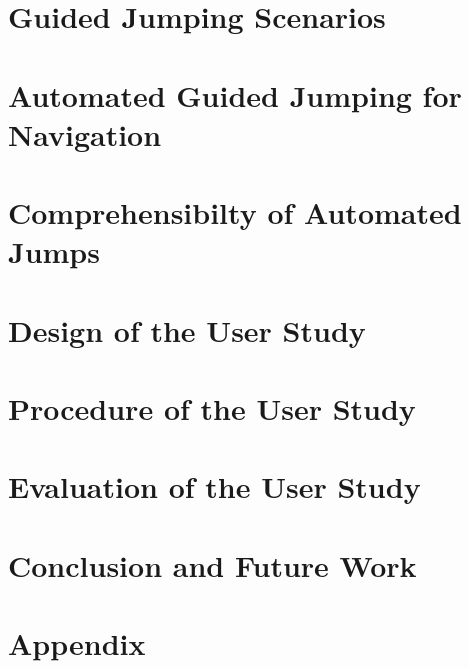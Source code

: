 
\chapter{Guided Jumping Scenarios}



\chapter{Automated Guided Jumping for Navigation}
%


\chapter{Comprehensibilty of Automated Jumps}
%


\chapter{Design of the User Study}
%


\chapter{Procedure of the User Study}
%


\chapter{Evaluation of the User Study}
%


\chapter{Conclusion and Future Work}






{\footnotesize
{}

}


\appendix
\chapter{Appendix}



